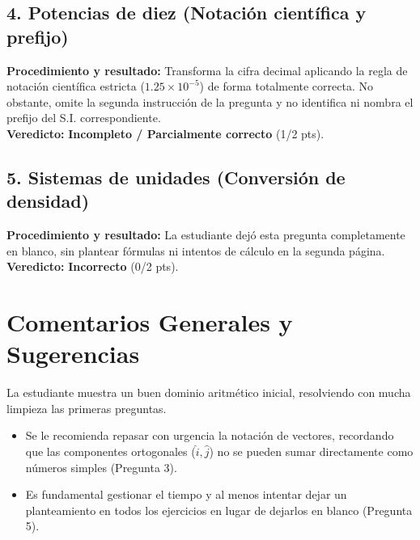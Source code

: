 \documentclass[12pt]{article}
\begin{document}
\subsection*{4. Potencias de diez (Notación científica y prefijo)}
\textbf{Procedimiento y resultado:} Transforma la cifra decimal aplicando la regla de notación científica estricta ($1.25 \times 10^{-5}$) de forma totalmente correcta. No obstante, omite la segunda instrucción de la pregunta y no identifica ni nombra el prefijo del S.I. correspondiente. \\
\textbf{Veredicto:} \textbf{Incompleto / Parcialmente correcto} (1/2 pts).

\subsection*{5. Sistemas de unidades (Conversión de densidad)}
\textbf{Procedimiento y resultado:} La estudiante dejó esta pregunta completamente en blanco, sin plantear fórmulas ni intentos de cálculo en la segunda página. \\
\textbf{Veredicto:} \textbf{Incorrecto} (0/2 pts).

\vspace{0.5cm}
\section*{Comentarios Generales y Sugerencias}
La estudiante muestra un buen dominio aritmético inicial, resolviendo con mucha limpieza las primeras preguntas. 
\begin{itemize}
    \item Se le recomienda repasar con urgencia la notación de vectores, recordando que las componentes ortogonales ($\hat{i}, \hat{j}$) no se pueden sumar directamente como números simples (Pregunta 3).
    \item Es fundamental gestionar el tiempo y al menos intentar dejar un planteamiento en todos los ejercicios en lugar de dejarlos en blanco (Pregunta 5).
\end{itemize}
\end{document}
